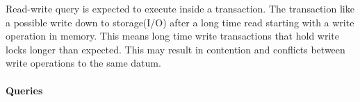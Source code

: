 
Read-write query is expected to execute inside a transaction. The transaction
like a possible write down to storage(I/O) after a long time read starting with
a write operation in memory. This means long time write transactions that hold
write locks longer than expected. This may result in contention and conflicts
between write operations to the same datum.



\paragraph{Queries}
{\raggedright
}